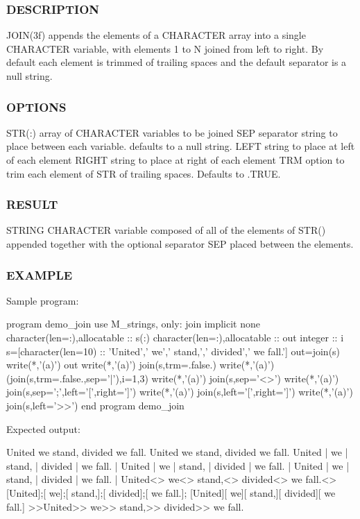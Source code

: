  \subsubsection*{D\+E\+S\+C\+R\+I\+P\+T\+I\+ON}

J\+O\+I\+N(3f) appends the elements of a C\+H\+A\+R\+A\+C\+T\+ER array into a single C\+H\+A\+R\+A\+C\+T\+ER variable, with elements 1 to N joined from left to right. By default each element is trimmed of trailing spaces and the default separator is a null string.

\subsubsection*{O\+P\+T\+I\+O\+NS}

S\+T\+R(\+:) array of C\+H\+A\+R\+A\+C\+T\+ER variables to be joined S\+EP separator string to place between each variable. defaults to a null string. L\+E\+FT string to place at left of each element R\+I\+G\+HT string to place at right of each element T\+RM option to trim each element of S\+TR of trailing spaces. Defaults to .T\+R\+UE.

\subsubsection*{R\+E\+S\+U\+LT}

S\+T\+R\+I\+NG C\+H\+A\+R\+A\+C\+T\+ER variable composed of all of the elements of S\+T\+R() appended together with the optional separator S\+EP placed between the elements.

\subsubsection*{E\+X\+A\+M\+P\+LE}

Sample program\+: \begin{DoxyVerb}program demo_join
use M_strings, only: join
implicit none
character(len=:),allocatable  :: s(:)
character(len=:),allocatable  :: out
integer                       :: i
   s=[character(len=10) :: 'United',' we',' stand,',' divided',' we fall.']
   out=join(s)
   write(*,'(a)') out
   write(*,'(a)') join(s,trm=.false.)
   write(*,'(a)') (join(s,trm=.false.,sep='|'),i=1,3)
   write(*,'(a)') join(s,sep='<>')
   write(*,'(a)') join(s,sep=';',left='[',right=']')
   write(*,'(a)') join(s,left='[',right=']')
   write(*,'(a)') join(s,left='>>')
end program demo_join
\end{DoxyVerb}


Expected output\+: \begin{DoxyVerb}United we stand, divided we fall.
United     we        stand,    divided   we fall.
United    | we       | stand,   | divided  | we fall. |
United    | we       | stand,   | divided  | we fall. |
United    | we       | stand,   | divided  | we fall. |
United<> we<> stand,<> divided<> we fall.<>
[United];[ we];[ stand,];[ divided];[ we fall.];
[United][ we][ stand,][ divided][ we fall.]
>>United>> we>> stand,>> divided>> we fall.
\end{DoxyVerb}


